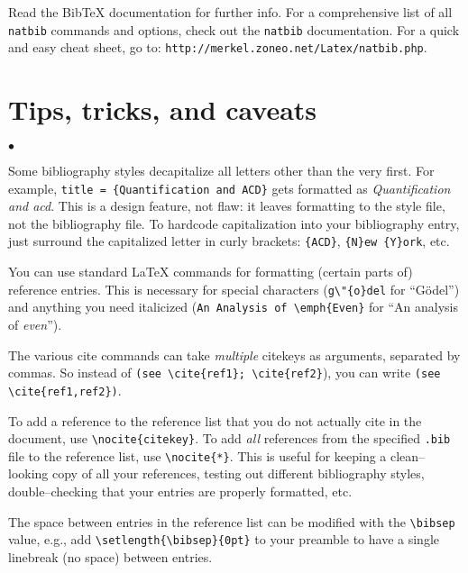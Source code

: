 \documentclass[letterpaper,12pt]{article}
\newcounter{ex-count}
\renewenvironment{itemize}{%
  \begin{list}{$\bullet$}{%
    \setlength{\leftmargin}{0em}
  }
}{%
  \end{list}
}
\begin{document}
Read the Bib\TeX{} documentation for further info. For a comprehensive list of
all \verb-natbib- commands and options, check out the \verb-natbib-
documentation. For a quick and easy cheat sheet, go to:
\texttt{http://merkel.zoneo.net/Latex/natbib.php}.


\section{Tips, tricks, and caveats}

\begin{itemize}

\item Some bibliography styles decapitalize all letters other than the very
    first. For example, \verb-title = {Quantification and ACD}- gets formatted
    as \emph{Quantification and acd}. This is a design feature, not flaw: it
    leaves formatting to the style file, not the bibliography file. To hardcode
    capitalization into your bibliography entry, just surround the capitalized
    letter in curly brackets: \verb-{ACD}-, \verb-{N}ew {Y}ork-, etc.

\item You can use standard \LaTeX{} commands for formatting (certain parts of)
    reference entries. This is necessary for special characters
    (\verb-g\"{o}del- for ``G\"{o}del'') and anything you need italicized
    (\verb-An Analysis of \emph{Even}- for ``An analysis of \emph{even}'').

\item The various cite commands can take \emph{multiple} citekeys as arguments,
    separated by commas. So instead of \verb-(see \cite{ref1}; \cite{ref2}-),
    you can write \verb-(see \cite{ref1,ref2})-.

\item To add a reference to the reference list that you do not actually cite in
    the document, use \verb-\nocite{citekey}-. To add \emph{all} references from
    the specified \verb-.bib- file to the reference list, use \verb-\nocite{*}-.
    This is useful for keeping a clean--looking copy of all your references,
    testing out different bibliography styles, double--checking that your
    entries are properly formatted, etc.

\item The space between entries in the reference list can be modified with the
    \verb-\bibsep- value, e.g., add \verb-\setlength{\bibsep}{0pt}- to your
    preamble to have a single linebreak (no space) between entries.


\end{itemize}
\end{document}
